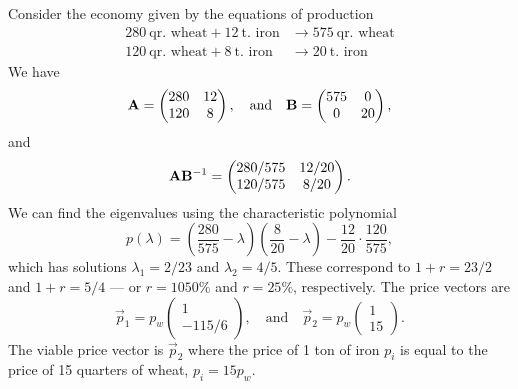 \begin{example}
  Consider the economy given by the equations of production
  \begin{subequations}
    \begin{align}
      280~\mbox{qr. wheat} + 12~\mbox{t. iron} &\to 575~\mbox{qr. wheat}\\
      120~\mbox{qr. wheat} + 8~\mbox{t. iron} &\to 20~\mbox{t. iron}
    \end{align}
  \end{subequations}
  We have
  \begin{equation}
    \mathbf{A} = \begin{pmatrix}280 & 12\\
      120 & 8
    \end{pmatrix},
    \quad\mbox{and}\quad
    \mathbf{B} = \begin{pmatrix}575 & 0\\
      0 & 20
    \end{pmatrix},
  \end{equation}
  and
  \begin{equation}
    \mathbf{A}\mathbf{B}^{-1} = \begin{pmatrix}280/575 & 12/20\\
      120/575 & 8/20
    \end{pmatrix}.
  \end{equation}
  We can find the eigenvalues using the characteristic polynomial
  \begin{equation}
p(\lambda) = \left(\frac{280}{575}-\lambda\right)\left(\frac{8}{20}-\lambda\right)-\frac{12}{20}\cdot\frac{120}{575},
  \end{equation}
  which has solutions $\lambda_{1}=2/23$ and $\lambda_{2}=4/5$. These correspond
  to $1+r=23/2$ and $1+r=5/4$ --- or $r=1050\%$ and $r=25\%$, respectively.
  The price vectors are
  \begin{equation}
\vec{p}_{1} = p_{w}\begin{pmatrix}1\\-115/6
\end{pmatrix},\quad\mbox{and}\quad\vec{p}_{2}= p_{w}\begin{pmatrix}1\\15
\end{pmatrix}.
  \end{equation}
  The viable price vector is $\vec{p}_{2}$ where the price of 1 ton of iron
  $p_{i}$ is equal to the price of 15 quarters of wheat, $p_{i}=15p_{w}$.
\end{example}


